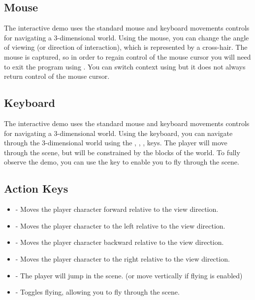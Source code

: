 \documentclass[a4paper,11pt,titlepage]{scrartcl}
\begin{document}
\subsection{Mouse}
The interactive demo uses the standard mouse and keyboard movements controls for navigating a 3-dimensional world.  Using the mouse, you can change the angle of viewing (or direction of interaction), which is represented by a cross-hair.  The mouse is captured, so in order to regain control of the mouse cursor you will need to exit the program using .  You can switch context using  but it does not always return control of the mouse cursor.

\subsection{Keyboard}
The interactive demo uses the standard mouse and keyboard movements controls for navigating a 3-dimensional world.   Using the keyboard, you can navigate through the 3-dimensional world using the , , ,  keys.  The player will move through the scene, but will be constrained by the blocks of the world.  To fully observe the demo, you can use the  key to enable you to fly through the scene.

\subsection{Action Keys}
\begin{itemize}
	\item {} - Moves the player character forward relative to the view direction.
	\item {} - Moves the player character to the left relative to the view direction.
	\item {} - Moves the player character backward relative to the view direction.
	\item {} - Moves the player character to the right relative to the view direction.
	\item {} - The player will jump in the scene. (or move vertically if flying is enabled)
	\item {} - Toggles flying, allowing you to fly through the scene.
\end{itemize}
      
\end{document}
